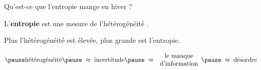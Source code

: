 


\begin{frame}{\Large Qu'est-ce que l'entropie mange en hiver ?}

\vskip 1.0cm

\begin{center}
\pause \Huge L'\textbf{entropie}
\vskip 0.1cm
\Large \pause \Large est une mesure  de
\vskip -0.1cm
\pause \Huge l'\og h\'et\'erog\'en\'eit\'e \fg.

\vskip 0.25cm
\large
\pause Plus l'h\'et\'erog\'en\'eit\'e est \'elev\'ee,\;
\pause plus grande est l'entropie.
\end{center}

\vskip -0.5cm

\begin{equation*}
\pause \textnormal{h\'et\'erog\'en\'eit\'e}
\pause \; \approx \; \textnormal{incertitude}
\pause \; \approx \; \begin{array}{c} \textnormal{le manque} \\ \textnormal{d'information} \end{array}
\pause \; \approx \; \textnormal{d\'esordre}
\end{equation*}

\normalsize
\end{frame}


